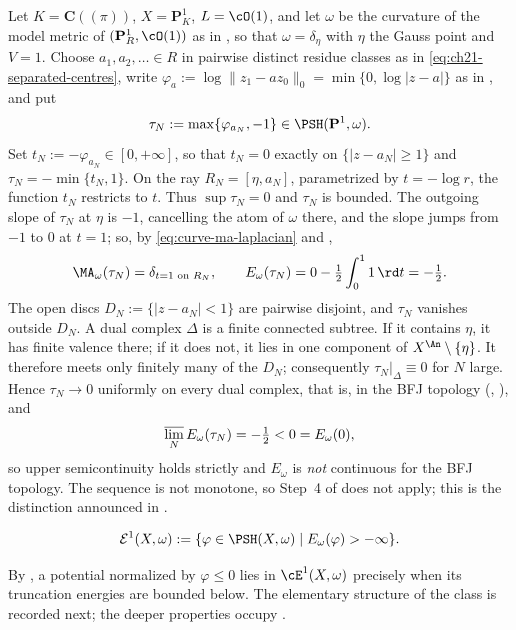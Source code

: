 \begin{example}
\label{ex:ch26-usc-strict}
Let $K=\mathbf C((\pi))$, $X=\mathbf P^1_K$, $L=\cO(1)$, and let
$\omega$ be the curvature of the model metric of
$(\mathbf P^1_R,\cO(1))$ as in , so that
$\omega=\delta_\eta$ with $\eta$ the Gauss point and $V=1$.  Choose
$a_1,a_2,\ldots\in R$ in pairwise distinct residue classes as in
\eqref{eq:ch21-separated-centres}, write
$\varphi_{a}:=\log\lVert z_1-az_0\rVert_0=\min\{0,\log|z-a|\}$ as in
, and put
\[
 \tau_N:=\max\{\varphi_{a_N},-1\}\in\PSH(\mathbf P^1,\omega).
\]
Set $t_N:=-\varphi_{a_N}\in[0,+\infty]$, so that $t_N=0$ exactly on
$\{|z-a_N|\geq1\}$ and $\tau_N=-\min\{t_N,1\}$.  On the ray
$R_N=[\eta,a_N]$, parametrized by $t=-\log r$, the function $t_N$
restricts to $t$.  Thus $\sup\tau_N=0$ and $\tau_N$ is bounded.  The
outgoing slope of $\tau_N$ at $\eta$ is $-1$, cancelling the atom of
$\omega$ there, and the slope jumps from $-1$ to $0$ at $t=1$; so, by
\eqref{eq:curve-ma-laplacian} and ,
\[
 \MA_\omega(\tau_N)=\delta_{t=1\text{ on }R_N},
 \qquad
 E_\omega(\tau_N)=0-\tfrac12\int_0^11\,\rd t=-\tfrac12 .
\]
The open discs $D_N:=\{|z-a_N|<1\}$ are pairwise disjoint, and
$\tau_N$ vanishes outside $D_N$.  A dual complex $\Delta$ is a finite
connected subtree.  If it contains $\eta$, it has finite valence there;
if it does not, it lies in one component of
$X^{\An}\setminus\{\eta\}$.  It therefore meets only finitely many of
the $D_N$; consequently
$\tau_N|_\Delta\equiv0$ for $N$ large.  Hence $\tau_N\to0$ uniformly on
every dual complex, that is, in the BFJ topology
(,
), and
\[
 \varlimsup_N E_\omega(\tau_N)=-\tfrac12<0=E_\omega(0),
\]
so upper semicontinuity holds strictly and $E_\omega$ is \emph{not}
continuous for the BFJ topology.  The sequence is not monotone, so
Step~4 of  does not apply; this is the
distinction announced in .
\end{example}

\begin{definition}
\label{def:e1}
\[
 \mathcal E^1(X,\omega)
 :=\{\varphi\in\PSH(X,\omega)\mid E_\omega(\varphi)>-\infty\}.
\]
\end{definition}

By , a potential normalized by
$\varphi\leq0$ lies in $\cE^1(X,\omega)$ precisely when its truncation
energies are bounded below.  The elementary structure of the class is
recorded next; the deeper properties occupy
.

